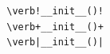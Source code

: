\documentclass[a4paper]{article}
\title{}
\date{}
\begin{document}
    \maketitle
    
    \begin{verbatim}
        \verb!__init__()!
        \verb+__init__()+
        \verb|__init__()|
    \end{verbatim}
\end{document}
